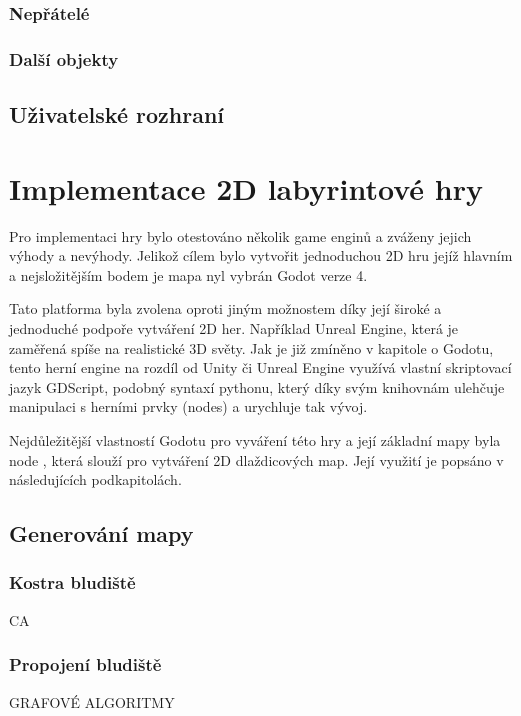 \subsection*{Nepřátelé}
\subsection*{Další objekty}
 
\section{Uživatelské rozhraní}

\chapter{Implementace 2D labyrintové hry} %
Pro implementaci hry bylo otestováno několik game enginů a zváženy jejich výhody a nevýhody. Jelikož cílem bylo vytvořit jednoduchou 2D hru jejíž hlavním a nejsložitějším bodem je mapa nyl vybrán Godot verze 4. 

Tato platforma byla zvolena oproti jiným možnostem díky její široké a jednoduché podpoře vytváření 2D her. Například Unreal Engine, která je zaměřená spíše na realistické 3D světy. Jak je již zmíněno v kapitole o Godotu, tento herní engine na rozdíl od Unity či Unreal Engine využívá vlastní skriptovací jazyk GDScript, podobný syntaxí pythonu, který díky svým knihovnám ulehčuje manipulaci s herními prvky (nodes) a urychluje tak vývoj.

Nejdůležitější vlastností Godotu pro vyváření této hry a její základní mapy byla node , která slouží pro vytváření 2D dlaždicových map. Její využití je popsáno v následujících podkapitolách.
    
\section{Generování mapy}
\subsection*{Kostra bludiště}
CA
\subsection*{Propojení bludiště}
GRAFOVÉ ALGORITMY

